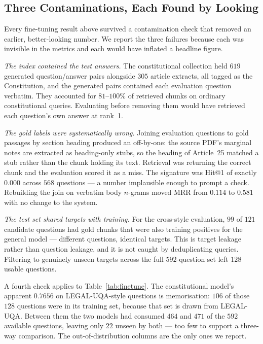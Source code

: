 \documentclass[conference]{IEEEtran}
\begin{document}
\subsection{Three Contaminations, Each Found by Looking}
\label{sec:leakage}
Every fine-tuning result above survived a contamination check that removed an
earlier, better-looking number. We report the three failures because each was
invisible in the metrics and each would have inflated a headline figure.

\emph{The index contained the test answers.} The constitutional collection held
$619$ generated question/answer pairs alongside $305$ article extracts, all
tagged as the Constitution, and the generated pairs contained each evaluation
question verbatim. They accounted for $81$--$100\%$ of retrieved chunks on
ordinary constitutional queries. Evaluating before removing them would have
retrieved each question's own answer at rank~1.

\emph{The gold labels were systematically wrong.} Joining evaluation questions
to gold passages by section heading produced an off-by-one: the source PDF's
marginal notes are extracted as heading-only stubs, so the heading of Article~25
matched a stub rather than the chunk holding its text. Retrieval was returning
the correct chunk and the evaluation scored it as a miss. The signature was
Hit@1 of exactly $0.000$ across $568$ questions --- a number implausible enough
to prompt a check. Rebuilding the join on verbatim body $n$-grams moved MRR from
$0.114$ to $0.581$ with no change to the system.

\emph{The test set shared targets with training.} For the cross-style
evaluation, $99$ of $121$ candidate questions had gold chunks that were also
training positives for the general model --- different questions, identical
targets. This is target leakage rather than question leakage, and it is not
caught by deduplicating queries. Filtering to genuinely unseen targets across
the full $592$-question set left $128$ usable questions.

A fourth check applies to Table~\ref{tab:finetune}. The constitutional model's
apparent $0.7656$ on LEGAL-UQA-style questions is memorisation: $106$ of those
$128$ questions were in its training set, because that set is drawn from
LEGAL-UQA. Between them the two models had consumed $464$ and $471$ of the $592$
available questions, leaving only $22$ unseen by both --- too few to support a
three-way comparison. The out-of-distribution columns are the only ones we
report.
\end{document}
